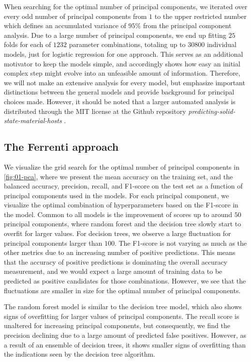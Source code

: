 When searching for the optimal number of principal components, we iterated over every odd number of principal components from $1$ to the upper restricted number which defines an accumulated variance of $95\%$ from the principal component analysis. Due to a large number of principal components, we end up fitting $25$ folds for each of $1232$ parameter combinations, totaling up to $30800$ individual models, just for logistic regression for one approach. This serves as an additional motivator to keep the models simple, and accordingly shows how easy an initial complex step might evolve into an unfeasible amount of information. Therefore, we will not make an extensive analysis for every model, but emphasize important distinctions between the general models and provide background for principal choices made. However, it should be noted that a larger automated analysis is distributed through the MIT license at the Github repository \textit{predicting-solid-state-material-hosts} \cite{Ohebbi2021}.


\subsection{The Ferrenti approach}

We visualize the grid search for the optimal number of principal components in \autoref{fig:01-pca}, where we present the mean accuracy on the training set, and the balanced accuracy, precision, recall, and F1-score on the test set as a function of principal components used in the models. For each principal component, we visualize the optimal combination of hyperparameters based on the F1-score in the model. Common to all models is the improvement of scores up to around $50$ principal components, where random forest and the decision tree slowly start to overfit for larger values. For decision trees, we observe a large fluctuation for principal components larger than $100$. The F1-score is not varying as much as the other metrics due to an increasing number of positive predictions. This means that the accuracy of positive predictions is dominating the overall accuracy measurement, and we would expect a large amount of training data to be predicted as positive candidates for those combinations. However, we see that the fluctuations are smaller in size for the optimal number of principal components.

The random forest model is similar to the decision tree model, which also shows signs of overfitting for larger values of principal components. The recall score is unaltered for increasing principal components, but consequently, we find the precision declining due to a large amount of predicted false positives.  However, as a result of an ensemble of decision trees, it shows smaller signs of overfitting than the indications seen by the decision tree algorithm.

